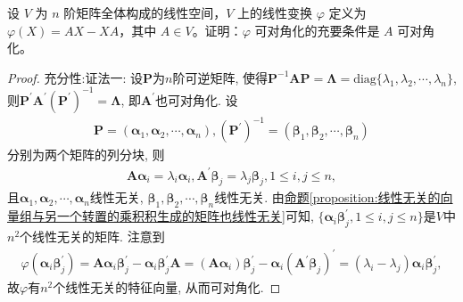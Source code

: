 \documentclass[../../main.tex]{subfiles}%
\begin{document}
\begin{example}
设 $V$ 为 $n$ 阶矩阵全体构成的线性空间，$V$ 上的线性变换 $\varphi$ 定义为 $\varphi(X)=AX - XA$，其中 $A\in V$。证明：$\varphi$ 可对角化的充要条件是 $A$ 可对角化。
\end{example}
\begin{proof}

{\heiti 充分性:}{\color{blue}证法一:}
设\(\boldsymbol{P}\)为\(n\)阶可逆矩阵, 使得\(\boldsymbol{P}^{-1}\boldsymbol{AP}=\boldsymbol{\Lambda}=\mathrm{diag}\{\lambda_{1},\lambda_{2},\cdots,\lambda_{n}\}\), 则\(\boldsymbol{P}^{\prime}\boldsymbol{A}^{\prime}(\boldsymbol{P}^{\prime})^{-1}=\boldsymbol{\Lambda}\), 即\(\boldsymbol{A}^{\prime}\)也可对角化. 设
\begin{align*}
\boldsymbol{P}=(\boldsymbol{\alpha}_{1},\boldsymbol{\alpha}_{2},\cdots,\boldsymbol{\alpha}_{n}), (\boldsymbol{P}^{\prime})^{-1}=(\boldsymbol{\beta}_{1},\boldsymbol{\beta}_{2},\cdots,\boldsymbol{\beta}_{n})
\end{align*}
分别为两个矩阵的列分块, 则
\begin{align*}
\boldsymbol{A}\boldsymbol{\alpha}_{i}=\lambda_{i}\boldsymbol{\alpha}_{i}, \boldsymbol{A}^{\prime}\boldsymbol{\beta}_{j}=\lambda_{j}\boldsymbol{\beta}_{j}, 1\leqslant  i,j\leqslant  n,
\end{align*}
且\(\boldsymbol{\alpha}_{1},\boldsymbol{\alpha}_{2},\cdots,\boldsymbol{\alpha}_{n}\)线性无关, \(\boldsymbol{\beta}_{1},\boldsymbol{\beta}_{2},\cdots,\boldsymbol{\beta}_{n}\)线性无关. 由\hyperref[proposition:线性无关的向量组与另一个转置的乘积积生成的矩阵也线性无关]{命题\ref{proposition:线性无关的向量组与另一个转置的乘积积生成的矩阵也线性无关}}可知, \(\{\boldsymbol{\alpha}_{i}\boldsymbol{\beta}_{j}^{\prime},1\leqslant  i,j\leqslant  n\}\)是\(V\)中\(n^{2}\)个线性无关的矩阵. 注意到
\begin{align*}
\varphi(\boldsymbol{\alpha}_{i}\boldsymbol{\beta}_{j}^{\prime})=\boldsymbol{A}\boldsymbol{\alpha}_{i}\boldsymbol{\beta}_{j}^{\prime}-\boldsymbol{\alpha}_{i}\boldsymbol{\beta}_{j}^{\prime}\boldsymbol{A}=(\boldsymbol{A}\boldsymbol{\alpha}_{i})\boldsymbol{\beta}_{j}^{\prime}-\boldsymbol{\alpha}_{i}(\boldsymbol{A}^{\prime}\boldsymbol{\beta}_{j})^{\prime}=(\lambda_{i}-\lambda_{j})\boldsymbol{\alpha}_{i}\boldsymbol{\beta}_{j}^{\prime},
\end{align*}
故\(\varphi\)有\(n^{2}\)个线性无关的特征向量, 从而可对角化.


\end{proof}
\end{document}
